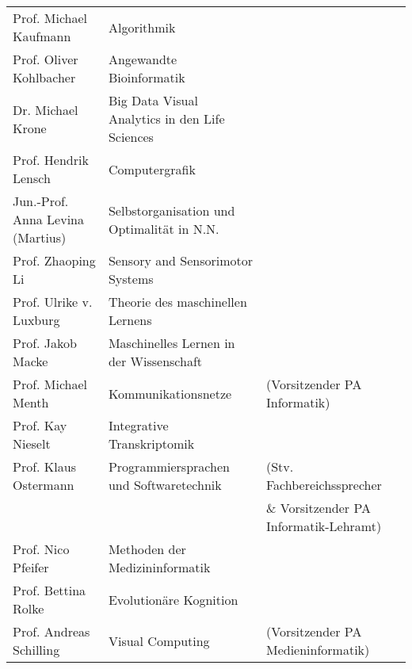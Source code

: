 \begin{tabular}{|lll|}
	Prof. Michael Kaufmann           & Algorithmik                                           &                                          \\
	Prof. Oliver Kohlbacher          & Angewandte Bioinformatik                              &                                          \\
	Dr. Michael Krone                & Big Data Visual Analytics in den Life Sciences        &                                          \\
	Prof. Hendrik Lensch             & Computergrafik                                        &                                          \\
	Jun.-Prof. Anna Levina (Martius) & Selbstorganisation und Optimalität in N.N.            &                                          \\
	Prof. Zhaoping Li                & Sensory and Sensorimotor Systems                      &                                          \\
	Prof. Ulrike v. Luxburg          & Theorie des maschinellen Lernens                      &                                          \\
	Prof. Jakob Macke                & Maschinelles Lernen in der Wissenschaft               &                                          \\
	Prof. Michael Menth              & Kommunikationsnetze                                   & (Vorsitzender PA Informatik)             \\
	Prof. Kay Nieselt                & Integrative Transkriptomik                            &                                          \\
	Prof. Klaus Ostermann            & Programmiersprachen und Softwaretechnik               & (Stv. Fachbereichssprecher               \\
	                                 &                                                       & \& Vorsitzender PA Informatik-Lehramt)   \\
	Prof. Nico Pfeifer               & Methoden der Medizininformatik                        &                                          \\
	Prof. Bettina Rolke              & Evolutionäre Kognition                                &                                          \\
	Prof. Andreas Schilling          & Visual Computing                                      & (Vorsitzender PA Medieninformatik)       \\

\end{tabular}
